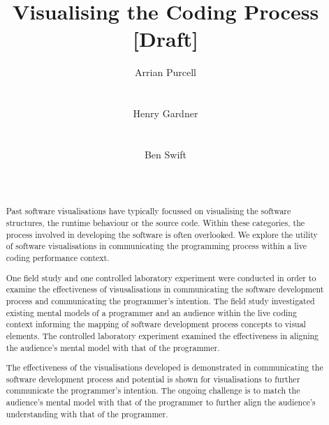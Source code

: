 \documentclass{sig-alternate}
\begin{document}

\title{Visualising the Coding Process {\color{red}[Draft]}}

\author{
\alignauthor Arrian Purcell\\
       \\
       \\
\alignauthor Henry Gardner\\
       \\
       \\
\alignauthor Ben Swift\\
       \\
       \\
}

\maketitle
\begin{abstract}

Past software visualisations have typically focussed on visualising the software structures, the runtime behaviour or the source code. Within these categories, the process involved in developing the software is often overlooked. We explore the utility of software visualisations in communicating the programming process within a live coding performance context.

One field study and one controlled laboratory experiment were conducted in order to examine the effectiveness of visusalisations in communicating the software development process and communicating the programmer's intention. The field study investigated existing mental models of a programmer and an audience within the live coding context informing the mapping of software development process concepts to visual elements. The controlled laboratory experiment examined the effectiveness in aligning the audience's mental model with that of the programmer.

The effectiveness of the visualisations developed is demonstrated in communicating the software development process and potential is shown for visualisations to further communicate the programmer's intention. The ongoing challenge is to match the audience's mental model with that of the programmer to further align the audience's understanding with that of the programmer.

\end{abstract}
\end{document}
